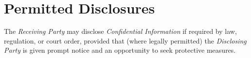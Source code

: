 
\section{Permitted Disclosures}
\label{sec:disclosure}

The \textit{Receiving Party} may disclose \textit{Confidential Information} if required by law, regulation, or court order, provided that (where legally permitted) the \textit{Disclosing Party} is given prompt notice and an opportunity to seek protective measures.

